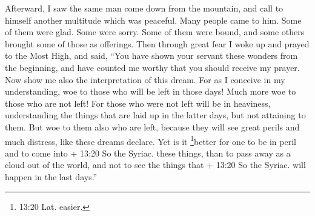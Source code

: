  Afterward, I saw the same man come down from the mountain,
and call to himself another multitude which was peaceful. 
Many people came to him. Some of them were glad. Some were sorry. Some
of them were bound, and some others brought some of those as offerings.
Then through great fear I woke up and prayed to the Most High, and said,
 ``You have shown your servant these wonders from the
beginning, and have counted me worthy that you should receive my prayer.
 Now show me also the interpretation of this dream.
 For as I conceive in my understanding, woe to those who
will be left in those days! Much more woe to those who are not left!
 For those who were not left will be in heaviness,
 understanding the things that are laid up in the latter
days, but not attaining to them.  But woe to them also who
are left, because they will see great perils and much distress, like
these dreams declare.  Yet is it \footnote{13:20 Lat.
  easier.}better for one to be in peril and to come into + 13:20 So the
Syriac. these things, than to pass away as a cloud out of the world, and
not to see the things that + 13:20 So the Syriac. will happen in the
last days.''

